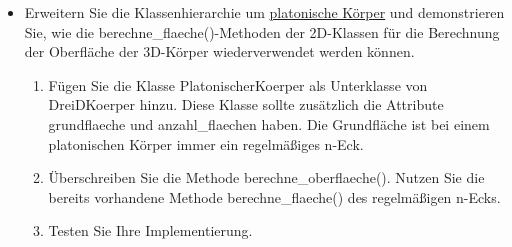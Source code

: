\begin{myexercise}
\begin{itemize}
    \item [c)]Erweitern Sie die Klassenhierarchie um \href{h[https://de.wikipedia.org/wiki/Platonischer_K%C3%B6rper](https://de.wikipedia.org/wiki/Platonischer_K%C3%B6rper)}{platonische Körper} und demonstrieren Sie, wie die berechne\_flaeche()-Methoden der 2D-Klassen für die Berechnung der Oberfläche der 3D-Körper wiederverwendet werden können.
    \begin{enumerate}
        \item Fügen Sie die Klasse PlatonischerKoerper als Unterklasse von DreiDKoerper hinzu. Diese Klasse sollte zusätzlich die Attribute grundflaeche und anzahl\_flaechen haben. Die Grundfläche ist bei einem platonischen Körper immer ein regelmäßiges n-Eck.
        \item Überschreiben Sie die Methode berechne\_oberflaeche(). Nutzen Sie die bereits vorhandene Methode berechne\_flaeche() des regelmäßigen n-Ecks.
        \item Testen Sie Ihre Implementierung.
    \end{enumerate}
\end{itemize}
\end{myexercise}